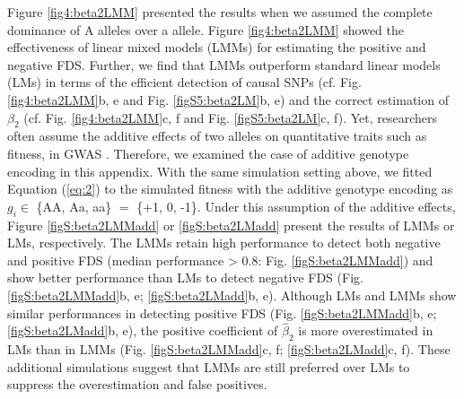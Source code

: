 \documentclass[12pt,]{article}
\begin{document}
Figure \ref{fig4:beta2LMM} presented the results when we assumed the complete dominance of A alleles over a allele. Figure \ref{fig4:beta2LMM} showed the effectiveness of linear mixed models (LMMs) for estimating the positive and negative FDS. Further, we find that LMMs outperform standard linear models (LMs) in terms of the efficient detection of causal SNPs (cf. Fig. \ref{fig4:beta2LMM}b, e and Fig. \ref{figS5:beta2LM}b, e) and the correct estimation of $\beta_2$ (cf. Fig. \ref{fig4:beta2LMM}c, f and Fig. \ref{figS5:beta2LM}c, f). Yet, researchers often assume the additive effects of two alleles on quantitative traits such as fitness, in GWAS \citep[e.g,][]{gondro2013genome,R_gaston}. Therefore, we examined the case of additive genotype encoding in this appendix. With the same simulation setting above, we fitted Equation (\ref{eq:2}) to the simulated fitness with the additive genotype encoding as $g_i \in$ \{AA, Aa, aa\} $=$ \{+1, 0, -1\}. Under this assumption of the additive effects, Figure \ref{figS:beta2LMMadd} or \ref{figS:beta2LMadd} present the results of LMMs or LMs, respectively. The LMMs retain high performance to detect both negative and positive FDS (median performance > 0.8: Fig. \ref{figS:beta2LMMadd}) and show better performance than LMs to detect negative FDS (Fig. \ref{figS:beta2LMMadd}b, e; \ref{figS:beta2LMadd}b, e). Although LMs and LMMs show similar performances in detecting positive FDS (Fig. \ref{figS:beta2LMMadd}b, e; \ref{figS:beta2LMadd}b, e), the positive coefficient of $\hat{\beta}_2$ is more overestimated in LMs than in LMMs (Fig. \ref{figS:beta2LMMadd}c, f; \ref{figS:beta2LMadd}c, f). These additional simulations suggest that LMMs are still preferred over LMs to suppress the overestimation and false positives.

\newpage
\clearpage
\medskip
\end{document}
